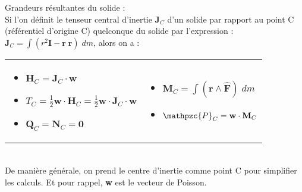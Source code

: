 \documentclass[a4paper]{article}
\begin{document}
Grandeurs résultantes du solide : \\
Si l'on définit le tenseur central d'inertie $\textbf{J}_C $ d'un solide par rapport au point C (référentiel d'origine C) quelconque du solide par l'expression : $\displaystyle \textbf{J}_C = \int ( r^2 \textbf{I} - \textbf{r} \; \textbf{r} ) \; d m $, alors on a : \\
\begin{tabular}{p{}p{}}
\begin{itemize}
\item $\displaystyle \textbf{H}_C = \textbf{J}_C \cdot \textbf{w} $
\item $\displaystyle T_C = \frac{1}{2} \textbf{w} \cdot \textbf{H}_C = \frac{1}{2} \textbf{w} \cdot \textbf{J}_C \cdot \textbf{w} $
\item $\displaystyle \textbf{Q}_C = \textbf{N}_C = \textbf{0} $
\end{itemize} & 
\begin{itemize}
\item $\displaystyle \textbf{M}_C = \int (\textbf{r} \wedge \hat{\textbf{F}}) \; d m $
\item $\displaystyle \mathpzc{P}_C = \textbf{w} \cdot \textbf{M}_C $
\end{itemize} \end{tabular} \\
De manière générale, on prend le centre d'inertie comme point C pour simplifier les calculs. Et pour rappel, \textbf{w} est le vecteur de Poisson.
\end{document}
